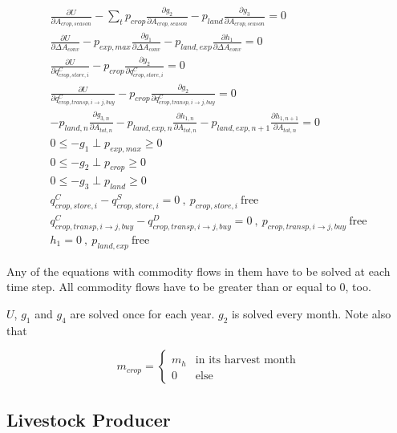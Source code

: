 \documentclass[letter,12pt]{article}
\begin{document}
\begin{gather}
\frac{\partial U}{\partial A_{crop,season}} - \sum_t p_{crop} \frac{\partial g_2}{\partial A_{crop,season}} - p_{land} \frac{\partial g_3}{\partial A_{crop,season}} = 0 \\
\frac{\partial U}{\partial \Delta A_{conv}} - p_{exp,max} \frac{\partial g_1}{\partial \Delta A_{conv}} - p_{land,exp} \frac{\partial h_1}{\partial \Delta A_{conv}} = 0 \\
\frac{\partial U}{\partial q_{crop,store,i}^C} - p_{crop} \frac{\partial g_2}{\partial q_{crop,store,i}^C} = 0 \\
\frac{\partial U}{\partial q_{crop,transp,i\rightarrow j,buy}^C} - p_{crop} \frac{\partial g_2}{\partial q_{crop,transp,i\rightarrow j,buy}^C} = 0 \\
- p_{land,n} \frac{\partial g_{3,n}}{\partial A_{tot,n}} - p_{land,exp,n} \frac{\partial h_{1,n}}{\partial A_{tot,n}} - p_{land,exp,n+1} \frac{\partial h_{1,n+1}}{\partial A_{tot,n}} = 0 \\
0 \leq -g_1 \perp p_{exp,max} \geq 0 \\
0 \leq -g_2 \perp p_{crop} \geq 0 \\
0 \leq -g_3 \perp p_{land} \geq 0 \\
q_{crop,store,i}^C - q_{crop,store,i}^S = 0 \ , \ p_{crop,store,i} \ \text{free} \\
q_{crop,transp,i\rightarrow j,buy}^C - q_{crop,transp,i\rightarrow j,buy}^D = 0 \ , \ p_{crop,transp,i\rightarrow j,buy} \ \text{free} \\
h_1 = 0 \ , \ p_{land,exp} \ \text{free}
\end{gather}

Any of the equations with commodity flows in them have to be solved at each time step.  All commodity flows have to be greater than or equal to 0, too.

$U$, $g_1$ and $g_4$ are solved once for each year.  $g_2$ is solved every month.  Note also that

\begin{equation}
m_{crop} = \left\{ \begin{array}{cc}
m_h			& \text{in its harvest month} \\
0				& \text{else} 
\end{array} \right.
\end{equation}

\subsection{Livestock Producer}
\end{document}
